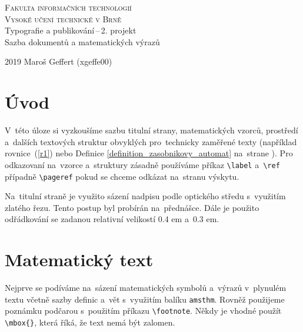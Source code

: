 \documentclass[11pt, a4paper, twocolumn ]{article}
\theoremstyle{definition}
\begin{document}
    \begin{titlepage}
        \begin{center}
            {\Huge \textsc{Fakulta informačních technologií \\
                            Vysoké učení technické v Brně}}\\
            
            \LARGE
            {Typografie a publikování\,--\,2. projekt \\
            Sazba dokumentů a matematických výrazů}\\
    \end{center}

    {\Large {2019 \hfill Maroš Geffert (xgeffe00)}}
\end{titlepage}

\label{page}

\section*{Úvod}
V~této úloze si vyzkoušíme sazbu titulní strany, matematických vzorců, prostředí a~dalších textových struktur obvyklých pro~technicky zaměřené texty (například rovnice~(\ref{r1}) nebo Definice \ref{definition_zasobnikovy_automat} na~strane \pageref{definition_zasobnikovy_automat}). Pro odkazovaní na~vzorce a~struktury zásadně používáme příkaz \verb|\label| a~\verb|\ref| případně \verb|\pageref| pokud se chceme odkázat na~stranu výskytu.\par
Na~titulní straně je využito sázení nadpisu podle optického středu s~využitím zlatého řezu. Tento postup byl probírán na~přednášce. Dále je použito odřádkování se zadanou relativní velikostí 0.4 em a~0.3 em.

\section{Matematický text}
Nejprve se podíváme na~sázení matematických symbolů a~výrazů v~plynulém textu včetně sazby definic a~vět s~využitím balíku \texttt{amsthm}. Rovněž použijeme poznámku podčarou s~použitím příkazu \verb|\footnote|. Někdy je vhodné použít  \verb|\mbox{}|, která říká, že text nemá být zalomen.\medskip
\end{document}
